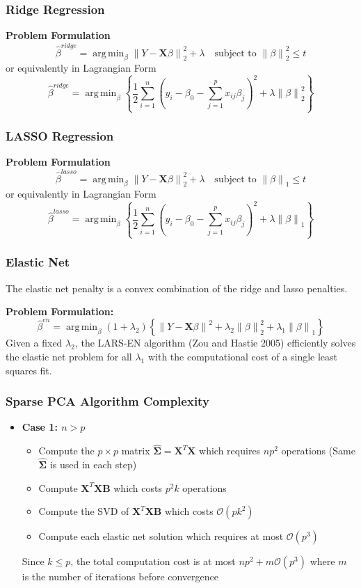 \documentclass{beamer}
\theoremstyle{plain}
\theoremstyle{definition}
\newcommand{\mat}[1]{\mathbf{#1}}
\DeclareMathOperator*{\argmin}{arg\,min}
\newcommand{\norm}[1]{\left\lVert #1 \right\rVert}
\begin{document}
\begin{frame}
\frametitle{Ridge Regression}
\textbf{Problem Formulation}
$$\hat{\beta}^{ridge} = \argmin_{\beta} \norm{Y - \mat{X}\beta}_{2}^{2} + \lambda \quad \text{subject to } \norm{\beta}_{2}^2 \leq t$$
or equivalently in Lagrangian Form
$$\hat{\beta}^{ridge} = \argmin_{\beta}\left\{\frac{1}{2}\sum_{i=1}^n (y_i - \beta_0 - \sum_{j=1}^p x_{ij}\beta_j)^2 + \lambda\norm{\beta}_{2}^2 \right\}$$
\end{frame}

\begin{frame}
\frametitle{LASSO Regression}
\textbf{Problem Formulation}
$$\hat{\beta}^{lasso} = \argmin_{\beta} \norm{Y - \mat{X}\beta}_{2}^{2} + \lambda \quad \text{subject to } \norm{\beta}_{1} \leq t$$
or equivalently in Lagrangian Form
$$\hat{\beta}^{lasso} = \argmin_{\beta}\left\{\frac{1}{2}\sum_{i=1}^n (y_i - \beta_0 - \sum_{j=1}^p x_{ij}\beta_j)^2 + \lambda\norm{\beta}_{1} \right\}$$
\end{frame}

\begin{frame}
\frametitle{Elastic Net}
The elastic net penalty is a convex combination of the ridge and lasso penalties.\linebreak

\textbf{Problem Formulation:}
$$\hat{\beta}^{en} = \argmin_{\beta} (1 + \lambda_2) \left\{\norm{Y - \mat X \beta}^2 + \lambda_2 \norm{\beta}_{2}^2 + \lambda_1 \norm{\beta}_{1} \right\}$$
Given a fixed $\lambda_2$, the LARS-EN algorithm (Zou and Hastie 2005) efficiently solves the elastic net problem for all $\lambda_1$
with the computational cost of a single least squares fit.
\end{frame}

\begin{frame}
\frametitle{Sparse PCA Algorithm Complexity}
\begin{itemize}
\item \textbf{Case 1: $n > p$}
\begin{itemize}
\item Compute the $p \times p$ matrix $\hat{\mat \Sigma} = \mat X^T \mat X$ which requires $np^2$ operations (Same $\hat{\mat \Sigma}$ is used in each step)
\item Compute $\mat X^T \mat X \mat B$ which costs $p^2k$ operations
\item Compute the SVD of $\mat X^T \mat X \mat B$ which costs $\mathcal{O}(pk^2)$
\item Compute each elastic net solution which requires at most $\mathcal{O}(p^3)$
\end{itemize}
Since $k \leq p$, the total computation cost is at most $np^2 + m\mathcal{O}(p^3)$ where $m$ is the number of iterations before convergence
\end{itemize}
\end{frame}
\end{document}
